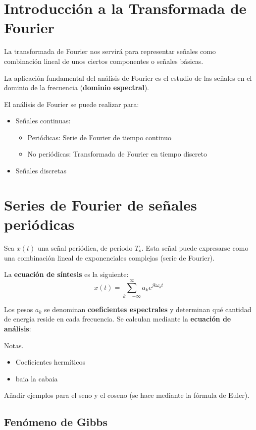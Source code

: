 \documentclass[a4paper]{book}
\begin{document}
\section{Introducción a la Transformada de Fourier}

La transformada de Fourier nos servirá para representar señales como combinación lineal de unos ciertos componentes o señales básicas.

La aplicación fundamental del análisis de Fourier es el estudio de las señales en el dominio de la frecuencia (\textbf{dominio espectral}).

El análisis de Fourier se puede realizar para:
\begin{itemize}
	 \item Señales continuas:
	 \begin{itemize}
		  \item Periódicas: Serie de Fourier de tiempo continuo
		  \item No periódicas: Transformada de Fourier en tiempo discreto
	 \end{itemize}
	 \item Señales discretas
\end{itemize}

\section{Series de Fourier de señales periódicas}
Sea $x(t)$ una señal periódica, de periodo $T_o$. Esta señal puede expresarse como una combinación lineal de exponenciales complejas (serie de Fourier).

La \textbf{ecuación de síntesis} es la siguiente:
\begin{equation}
	x(t) = \sum_{k=-\infty}^{\infty}a_k e^{jk\omega _o t}
\end{equation}

Los pesos $a_k$ se denominan \textbf{coeficientes espectrales} y determinan qué cantidad de energía reside en cada frecuencia. Se calculan mediante la \textbf{ecuación de análisis}:
\[  \]

Notas.
\begin{itemize}
	 \item Coeficientes hermíticos
	 \item baia la cabaia
\end{itemize}

Añadir ejemplos para el seno y el coseno (se hace mediante la fórmula de Euler).

\subsection{Fenómeno de Gibbs}
\end{document}
